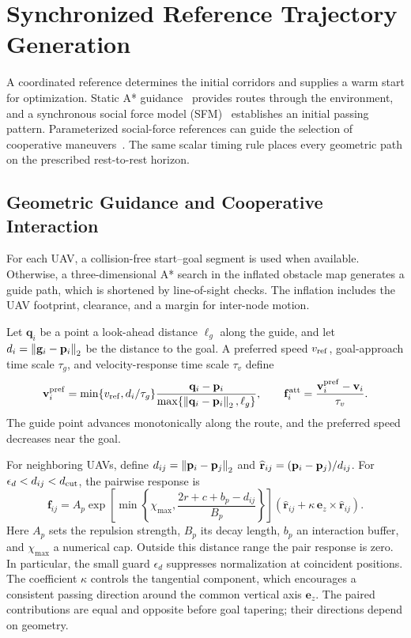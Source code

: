 \section{Synchronized Reference Trajectory Generation}
\label{sec:initialization}
A coordinated reference determines the initial corridors and supplies a warm start for optimization. Static A* guidance~\cite{hart1968} provides routes through the environment, and a synchronous social force model (SFM)~\cite{helbing1995} establishes an initial passing pattern. Parameterized social-force references can guide the selection of cooperative maneuvers~\cite{li2023priority}. The same scalar timing rule places every geometric path on the prescribed rest-to-rest horizon.

\subsection{Geometric Guidance and Cooperative Interaction}
For each UAV, a collision-free start--goal segment is used when available. Otherwise, a three-dimensional A* search in the inflated obstacle map generates a guide path, which is shortened by line-of-sight checks. The inflation includes the UAV footprint, clearance, and a margin for inter-node motion.

Let $\mathbf q_i$ be a point a look-ahead distance $\ell_g$ along the guide, and let $d_i=\left\lVert \mathbf g_i-\mathbf{p}_i\right\rVert_2$ be the distance to the goal. A preferred speed $v_{\rm ref}$, goal-approach time scale $\tau_g$, and velocity-response time scale $\tau_v$ define
\begin{equation}
 \mathbf{v}_i^{\rm pref}=\min\{v_{\rm ref},d_i/\tau_g\}
 \frac{\mathbf q_i-\mathbf{p}_i}{\max\{\left\lVert \mathbf q_i-\mathbf{p}_i\right\rVert_2,\ell_g\}},
 \qquad \mathbf f_i^{\rm att}=\frac{\mathbf{v}_i^{\rm pref}-\mathbf{v}_i}{\tau_v}.
 \label{eq:attraction}
\end{equation}
The guide point advances monotonically along the route, and the preferred speed decreases near the goal.

For neighboring UAVs, define $d_{ij}=\left\lVert \mathbf{p}_i-\mathbf{p}_j\right\rVert_2$ and $\widehat{\mathbf r}_{ij}=(\mathbf{p}_i-\mathbf{p}_j)/d_{ij}$. For $\epsilon_d<d_{ij}<d_{\rm cut}$, the pairwise response is
\begin{equation}
 \mathbf f_{ij}=A_p\exp\!\left[
 \min\left\{\chi_{\max},\frac{2r+c+b_p-d_{ij}}{B_p}\right\}\right]
 \left(\widehat{\mathbf r}_{ij}+\kappa\,\mathbf e_z\times\widehat{\mathbf r}_{ij}\right).
 \label{eq:repulsion}
\end{equation}
Here $A_p$ sets the repulsion strength, $B_p$ its decay length, $b_p$ an interaction buffer, and $\chi_{\max}$ a numerical cap. Outside this distance range the pair response is zero. In particular, the small guard $\epsilon_d$ suppresses normalization at coincident positions. The coefficient $\kappa$ controls the tangential component, which encourages a consistent passing direction around the common vertical axis $\mathbf e_z$. The paired contributions are equal and opposite before goal tapering; their directions depend on geometry.

